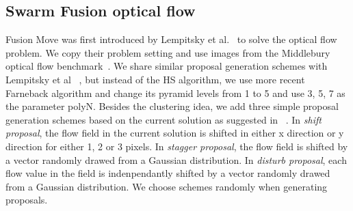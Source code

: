 \subsection{Swarm Fusion optical flow}

Fusion Move was first introduced by Lempitsky et al.~\cite{fusion_flow} to
solve the optical flow problem.
We copy their problem setting and use images from the Middlebury optical flow
benchmark~\cite{middlebury_optical_flow}. We share similar proposal generation schemes with Lempitsky et al ~\cite{fusion_flow}, but instead of the HS algorithm, we use more recent Farneback algorithm and change its pyramid levels from 1 to 5 and use {3, 5, 7} as the parameter polyN. Besides the clustering idea, we add three simple proposal generation schemes based on the current solution as suggested in ~\cite{fusion_flow}. In \textit{shift proposal}, the flow field in the current solution is shifted in either x direction or y direction for either 1, 2 or 3 pixels. In \textit{stagger proposal}, the flow field is shifted by a vector randomly drawed from a Gaussian distribution. In \textit{disturb proposal}, each flow value in the field is indenpendantly shifted by a vector randomly drawed from a Gaussian distribution. We choose schemes randomly when generating proposals.


